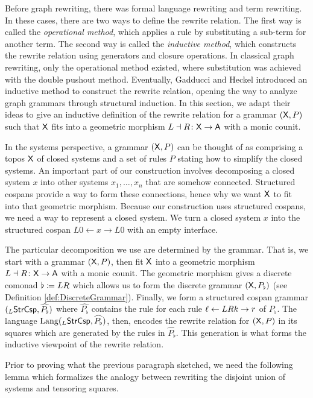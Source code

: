 \documentclass[oneside]{amsart}
\begin{document}
Before graph rewriting, there was formal language rewriting
and term rewriting. In these cases, there are two ways to
define the rewrite relation.  The first way is called the
\emph{operational method}, which applies a rule by
substituting a sub-term for another term.  The second way is
called the \emph{inductive method}, which constructs the
rewrite relation using generators and closure operations. In
classical graph rewriting, only the operational method
existed, where substitution was achieved with the double
pushout method.  Eventually, Gadducci and Heckel introduced
an inductive method to construct the rewrite relation,
opening the way to analyze graph grammars through structural
induction. In this section, we adapt their ideas to give an
inductive definition of the rewrite relation for a grammar
$ ( \mathsf{X},P ) $ such that $\mathsf{X} $ fits into a geometric morphism
$L \dashv R \colon \mathsf{X} \to \mathsf{A} $ with a monic counit.

In the systems perspective, a grammar $( \mathsf{X},P )$ can be
thought of as comprising a topos $\mathsf{X}$ of closed systems and
a set of rules $P$ stating how to simplify the closed
systems. An important part of our construction involves
decomposing a closed system $x$ into other systems
$x_1, \dotsc, x_n$ that are somehow connected. Structured
cospans provide a way to form these connections, hence why
we want $\mathsf{X}$ to fit into that geometric morphism. Because
our construction uses structured cospans, we need a way to
represent a closed system. We turn a closed system $x$ into
the structured cospan $L0 \gets x \to L0$ with an empty interface.

The particular decomposition we use are determined by the
grammar. That is, we start with a grammar $( \mathsf{X},P )$, then
fit $\mathsf{X}$ into a geometric morphism
$L \dashv R \colon \mathsf{X} \to \mathsf{A}$ with a monic counit. The
geometric morphism gives a discrete comonad
$\flat \coloneqq LR$ which allows us to form the discrete
grammar $(\mathsf{X},P_\flat)$ (see Definition
\ref{def:DiscreteGrammar}). Finally, we form a structured
cospan grammar $ ( _L \mathsf{StrCsp} , \widehat{P_\flat} ) $ where
$ \hat{P_\flat} $ contains the rule
 for each rule
$ \ell \leftarrow LRk \to r $ of $ P_{\flat} $. The language $\mathrm{Lang}
( _L \mathsf{StrCsp} , \widehat{P_\flat} )$, then, encodes the rewrite
relation for $( \mathsf{X},P )$ in its squares which are generated
by the rules in $\hat{P_\flat}$. This generation is what
forms the inductive viewpoint of the rewrite relation. 

Prior to proving what the previous paragraph sketched, we
need the following lemma which formalizes the analogy
between rewriting the disjoint union of systems and
tensoring squares.
\end{document}
